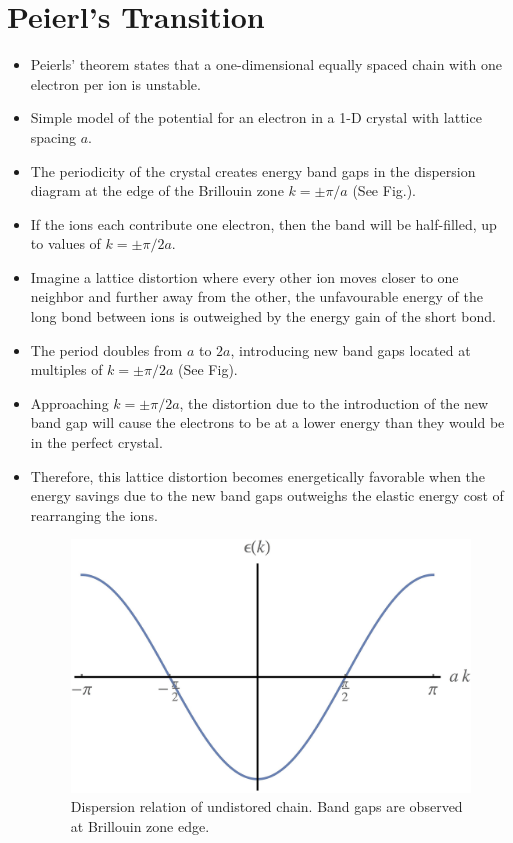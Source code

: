 \documentclass[10pt]{article}
\begin{document}
\section{Peierl's Transition}
\begin{itemize}
  \item Peierls' theorem states that a one-dimensional equally spaced chain with one electron per ion is unstable.
  \item Simple model of the potential for an electron in a 1-D crystal with lattice spacing $a$.
  \item The periodicity of the crystal creates energy band gaps in the dispersion diagram at the edge of the Brillouin zone $k = \pm \pi/a$ (See Fig.).
  \item If the ions each contribute one electron, then the band will be half-filled, up to values of $k = \pm \pi/2a$.
  \item Imagine a lattice distortion where every other ion moves closer to one neighbor and further away from the other, the unfavourable energy of the long bond between ions is outweighed by the energy gain of the short bond.
  \item The period doubles from $a$ to $2a$, introducing new band gaps located at multiples of $k = \pm \pi/2a$ (See Fig).
  \item Approaching $k = \pm \pi/2a$,  the distortion due to the introduction of the new band gap will cause the electrons to be at a lower energy than they would be in the perfect crystal.
  \item Therefore, this lattice distortion becomes energetically favorable when the energy savings due to the new band gaps outweighs the elastic energy cost of rearranging the ions.

\begin{figure}
  \centering
    \includegraphics[width=\textwidth]{p1}
    \caption{Dispersion relation of undistored chain. Band gaps are observed at Brillouin zone edge.}
\end{figure}


\end{itemize}
\end{document}
